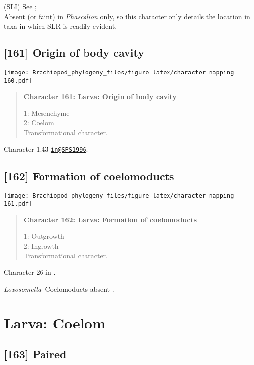 \documentclass[openany]{book}
\theoremstyle{definition}
\theoremstyle{definition}
\theoremstyle{definition}
\theoremstyle{remark}
\begin{document}
(SLI) See \citet{Haszprunar2000}; \citet{Richter2010}\\
Absent (or faint) in \emph{Phascolion} only, so this character only
details the location in taxa in which SLR is readily evident.

\subsection*{{[}161{]} Origin of body
cavity}\label{origin-of-body-cavity}

\texttt{[image: Brachiopod\_phylogeny\_files/figure-latex/character-mapping-160.pdf]}

\begin{quote}
\textbf{Character 161: Larva: Origin of body cavity}

1: Mesenchyme\\
2: Coelom\\
Transformational character.
\end{quote}

Character 1.43 \href{mailto:in@SPS1996}{\nolinkurl{in@SPS1996}}.

\subsection*{{[}162{]} Formation of
coelomoducts}\label{formation-of-coelomoducts}

\texttt{[image: Brachiopod\_phylogeny\_files/figure-latex/character-mapping-161.pdf]}

\begin{quote}
\textbf{Character 162: Larva: Formation of coelomoducts}

1: Outgrowth\\
2: Ingrowth\\
Transformational character.
\end{quote}

Character 26 in \citet{Haszprunar2000}.

\hypertarget{Loxosomella-coding-162}{}
\emph{Loxosomella}: Coelomoducts absent \citep{Haszprunar2000}.

\section{Larva: Coelom}\label{larva-coelom}

\subsection*{{[}163{]} Paired}\label{paired}
\end{document}
